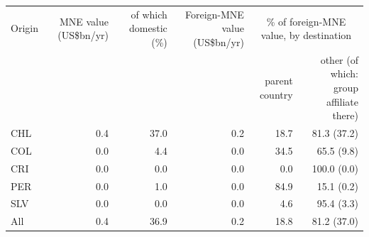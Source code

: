 \begin{tabular}{lrrrrr}
\toprule
Origin & MNE value (US\$bn/yr) & of which domestic (\%) & Foreign-MNE value (US\$bn/yr) & \multicolumn{2}{c}{\% of foreign-MNE value, by destination} \\
 & & & & parent country & other (of which: group affiliate there) \\
\midrule
CHL & 0.4 & 37.0 & 0.2 & 18.7 & 81.3 (37.2) \\
COL & 0.0 & 4.4 & 0.0 & 34.5 & 65.5 (9.8) \\
CRI & 0.0 & 0.0 & 0.0 & 0.0 & 100.0 (0.0) \\
PER & 0.0 & 1.0 & 0.0 & 84.9 & 15.1 (0.2) \\
SLV & 0.0 & 0.0 & 0.0 & 4.6 & 95.4 (3.3) \\
\midrule
All & 0.4 & 36.9 & 0.2 & 18.8 & 81.2 (37.0) \\
\bottomrule
\end{tabular}
